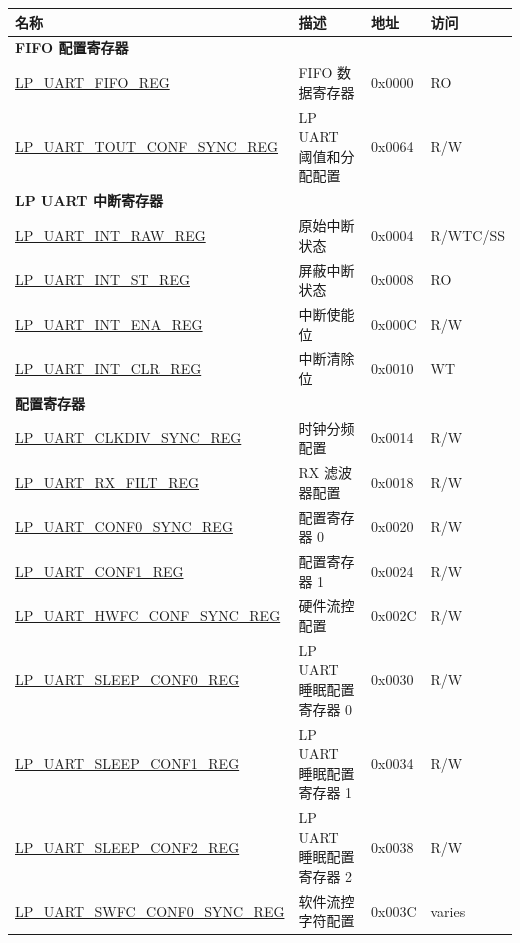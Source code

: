 \begin{longtable}{ | p{6.8cm} | p{5.7cm} | p{1.3cm} | p{1.7cm} | }
\hline\rowcolor{lightgray}
名称 & 描述 &  地址 & 访问 \\ \hline
\endhead
\multicolumn{4}{|l|}{\textbf{FIFO 配置寄存器}} \\ \hline
\hyperref[regdesc:LPUARTFIFOREG]{LP\_UART\_FIFO\_REG} & FIFO 数据寄存器 & 0x0000 & RO \\ \hline
\hyperref[regdesc:LPUARTTOUTCONFSYNCREG]{LP\_UART\_TOUT\_CONF\_SYNC\_REG} & LP UART 阈值和分配配置 & 0x0064 & R/W \\ \hline
\multicolumn{4}{|l|}{\textbf{LP UART 中断寄存器}} \\ \hline
\hyperref[regdesc:LPUARTINTRAWREG]{LP\_UART\_INT\_RAW\_REG} & 原始中断状态 & 0x0004 & R/WTC/SS \\ \hline
\hyperref[regdesc:LPUARTINTSTREG]{LP\_UART\_INT\_ST\_REG} & 屏蔽中断状态 & 0x0008 & RO \\ \hline
\hyperref[regdesc:LPUARTINTENAREG]{LP\_UART\_INT\_ENA\_REG} & 中断使能位 & 0x000C & R/W \\ \hline
\hyperref[regdesc:LPUARTINTCLRREG]{LP\_UART\_INT\_CLR\_REG} & 中断清除位 & 0x0010 & WT \\ \hline
\multicolumn{4}{|l|}{\textbf{配置寄存器}} \\ \hline
\hyperref[regdesc:LPUARTCLKDIVSYNCREG]{LP\_UART\_CLKDIV\_SYNC\_REG} & 时钟分频配置 & 0x0014 & R/W \\ \hline
\hyperref[regdesc:LPUARTRXFILTREG]{LP\_UART\_RX\_FILT\_REG} & RX 滤波器配置 & 0x0018 & R/W \\ \hline
\hyperref[regdesc:LPUARTCONF0SYNCREG]{LP\_UART\_CONF0\_SYNC\_REG} & 配置寄存器 0 & 0x0020 & R/W \\ \hline
\hyperref[regdesc:LPUARTCONF1REG]{LP\_UART\_CONF1\_REG} & 配置寄存器 1 & 0x0024 & R/W \\ \hline
\hyperref[regdesc:LPUARTHWFCCONFSYNCREG]{LP\_UART\_HWFC\_CONF\_SYNC\_REG} & 硬件流控配置 & 0x002C & R/W \\ \hline
\hyperref[regdesc:LPUARTSLEEPCONF0REG]{LP\_UART\_SLEEP\_CONF0\_REG} & LP UART 睡眠配置寄存器 0 & 0x0030 & R/W \\ \hline
\hyperref[regdesc:LPUARTSLEEPCONF1REG]{LP\_UART\_SLEEP\_CONF1\_REG} & LP UART 睡眠配置寄存器 1 & 0x0034 & R/W \\ \hline
\hyperref[regdesc:LPUARTSLEEPCONF2REG]{LP\_UART\_SLEEP\_CONF2\_REG} & LP UART 睡眠配置寄存器 2 & 0x0038 & R/W \\ \hline
\hyperref[regdesc:LPUARTSWFCCONF0SYNCREG]{LP\_UART\_SWFC\_CONF0\_SYNC\_REG} & 软件流控字符配置 & 0x003C & varies \\ \hline

\end{longtable}
